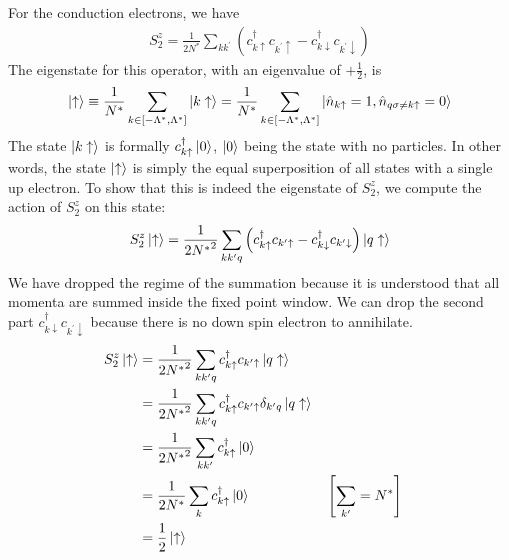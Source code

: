 \documentclass[12pt,twoside]{report}
\numberwithin{equation}{section}
\begin{document}
For the conduction electrons, we have
\begin{equation}\begin{aligned}
	S_2^z = \frac{1}{2N^*}\sum_{kk^\prime}\left(c^\dagger_{k \uparrow}c_{k^\prime \uparrow} - c^\dagger_{k \downarrow}c_{k^\prime \downarrow}\right)
\end{aligned}\end{equation}
The eigenstate for this operator, with an eigenvalue of \(+ \frac{1}{2}\), is
\begin{equation}\begin{aligned}
\ket{\uparrow} \equiv \frac{1}{N^*}\sum_{k \in \left[-\Lambda^*, \Lambda^*\right]} \ket{k \uparrow} = \frac{1}{N^*}\sum_{k \in \left[-\Lambda^*, \Lambda^*\right]}\ket{\hat n_{k \uparrow} = 1, \hat n_{q\sigma \neq k \uparrow} = 0}
\end{aligned}\end{equation}
The state \(\ket{k \uparrow}\) is formally \(c^\dagger_{k \uparrow} \ket{0}\), \(\ket{0}\) being the state with no particles. In other words, the state \(\ket{\uparrow}\) is simply the equal superposition of all states with a single up electron.
\pb To show that this is indeed the eigenstate of \(S^z_2\), we compute the action of \(S_2^z\) on this state:
\begin{equation}\begin{aligned}
	S_2^z \ket{\uparrow} = \frac{1}{2{N^*}^2}\sum_{kk^\prime q}\left(c^\dagger_{k \uparrow}c_{k^\prime \uparrow} - c^\dagger_{k \downarrow}c_{k^\prime \downarrow}\right)\ket{q \uparrow}
\end{aligned}\end{equation}
We have dropped the regime of the summation because it is understood that all momenta are summed inside the fixed point window. We can drop the second part \(c^\dagger_{k \downarrow}c_{k^\prime \downarrow}\) because there is no down spin electron to annihilate.
\begin{equation}\begin{aligned}
	S_2^z \ket{\uparrow} &= \frac{1}{2{N^*}^2}\sum_{kk^\prime q}c^\dagger_{k \uparrow}c_{k^\prime \uparrow}\ket{q \uparrow}\\
			     &=\frac{1}{2{N^*}^2}\sum_{kk^\prime q}c^\dagger_{k \uparrow}c_{k^\prime \uparrow}\delta_{k^\prime q}\ket{q \uparrow}\\
			     &=\frac{1}{2{N^*}^2}\sum_{kk^\prime}c^\dagger_{k \uparrow}\ket{0}\\
			     &=\frac{1}{2{N^*}}\sum_{k}c^\dagger_{k \uparrow}\ket{0} && \left[\sum_{k^\prime} = N^*\right] \\
			     &=\frac{1}{2}\ket{ \uparrow}
\end{aligned}\end{equation}
\end{document}
